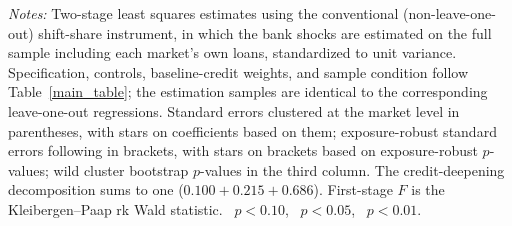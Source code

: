 \begin{threeparttable}
\begin{tablenotes}[flushleft]
        \footnotesize
        \item \textit{Notes:} Two-stage least squares estimates using the conventional (non-leave-one-out) shift-share instrument, in which the bank shocks are estimated on the full sample including each market's own loans, standardized to unit variance. Specification, controls, baseline-credit weights, and sample condition follow Table~\ref{main_table}; the estimation samples are identical to the corresponding leave-one-out regressions. Standard errors clustered at the market level in parentheses, with stars on coefficients based on them; exposure-robust standard errors following \citet{adao2019shiftshare} in brackets, with stars on brackets based on exposure-robust $p$-values; wild cluster bootstrap $p$-values in the third column. The credit-deepening decomposition sums to one ($0.100+0.215+0.686$). First-stage $F$ is the Kleibergen--Paap rk Wald statistic. \sym{*}~$p<0.10$, \sym{**}~$p<0.05$, \sym{***}~$p<0.01$.
    \end{tablenotes}
\end{threeparttable}
